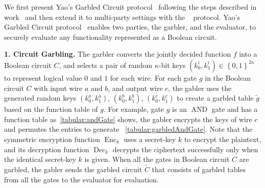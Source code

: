 



We first present Yao's Garbled Circuit protocol~\cite{yao1986generate} following the steps described in work~\cite{lindell2009proof} and then extend it to multi-party settings with the \bmr~\cite{beaver1990round} protocol.
Yao's Garbled Circuit protocol~\cite{yao1986generate} enables two parties, the garbler, and the evaluator, to securely evaluate any functionality represented as a Boolean circuit.

\textbf{1. Circuit Garbling.}
The garbler converts the jointly decided function $f$ into a Boolean circuit $C$, and selects a pair of random $\kappa$-bit keys $\left(k_0^i,k_1^i\right)\in \left\{0,1\right\}^{2\kappa}$ to represent logical value $0$ and $1$ for each wire. For each gate $g$ in the Boolean circuit $C$ with input wire $a$ and $b$, and output wire $c$, the gabler uses the generated random keys $\left(k_0^a,k_1^a\right)$, $\left(k_0^b,k_1^b\right)$, $\left(k_0^c,k_1^c\right)$ to create a garbled table $\tilde{g}$ based on the function table of $g$. For example, gate $g$ is an $\operatorname{AND}$ gate and has a function table as~\autoref{tabular:andGate} shows, the gabler encrypts the keys of wire $c$ and permutes the entries to generate ~\autoref{tabular:garbledAndGate}. Note that the symmetric encryption function $\operatorname{Enc}_k$ uses a secret-key $k$ to encrypt the plaintext, and its decryption function $\operatorname{Dec}_k$ decrypts the ciphertext successfully only when the identical secret-key $k$ is given. When all the gates in Boolean circuit $C$ are garbled, the gabler sends the garbled circuit $\widetilde{C}$ that consists of garbled tables from all the gates to the evaluator for evaluation.

